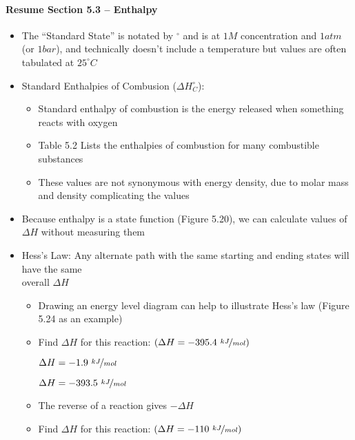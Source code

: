 \documentclass[12pt, openany, letterpaper]{memoir}
\begin{document}
\paragraph*{Resume Section 5.3 -- Enthalpy}
\begin{itemize}
  \item The ``Standard State'' is notated by $^\circ$ and is at $1M$ concentration and $1atm$ (or $1bar$), and technically doesn't include a temperature but values are often tabulated at $25^\circ C$
  \item Standard Enthalpies of Combusion ($\Delta H^\circ_C$):
    \begin{itemize}
      \item Standard enthalpy of combustion is the energy released when something reacts with oxygen
      \item Table 5.2 Lists the enthalpies of combustion for many combustible substances
      \item These values are not synonymous with energy density, due to molar mass and density complicating the values
    \end{itemize}
  \item Because enthalpy is a state function (Figure 5.20), we can calculate values of $\Delta H$ without measuring them
  \item Hess's Law: Any alternate path with the same starting and ending states will have the same\\overall $\Delta H$
  \begin{itemize}
    \item Drawing an energy level diagram can help to illustrate Hess's law (Figure 5.24 as an example)
    \item Find $\Delta H$ for this reaction:  \hspace{1em} $\left(\Delta H=-395.4~\nicefrac{kJ}{mol}\right)$

           \hspace{2em} $\Delta H=-1.9~\nicefrac{kJ}{mol}$

           \hspace{2em} $\Delta H=-393.5~\nicefrac{kJ}{mol}$
    \item The reverse of a reaction gives $-\Delta H$
    \item Find $\Delta H$ for this reaction:  \hspace{1em} $\left(\Delta H=-110~\nicefrac{kJ}{mol}\right)$


\end{itemize}
\end{itemize}
\end{document}
